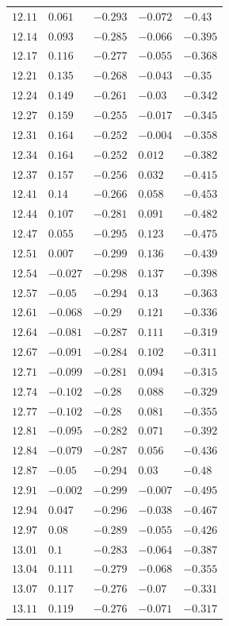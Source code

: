 \begin{center}
\begin{longtable}{lllll}
$12.11$&$0.061$&$-0.293$&$-0.072$&$-0.43$\\
$12.14$&$0.093$&$-0.285$&$-0.066$&$-0.395$\\
$12.17$&$0.116$&$-0.277$&$-0.055$&$-0.368$\\
$12.21$&$0.135$&$-0.268$&$-0.043$&$-0.35$\\
$12.24$&$0.149$&$-0.261$&$-0.03$&$-0.342$\\
$12.27$&$0.159$&$-0.255$&$-0.017$&$-0.345$\\
$12.31$&$0.164$&$-0.252$&$-0.004$&$-0.358$\\
$12.34$&$0.164$&$-0.252$&$0.012$&$-0.382$\\
$12.37$&$0.157$&$-0.256$&$0.032$&$-0.415$\\
$12.41$&$0.14$&$-0.266$&$0.058$&$-0.453$\\
$12.44$&$0.107$&$-0.281$&$0.091$&$-0.482$\\
$12.47$&$0.055$&$-0.295$&$0.123$&$-0.475$\\
$12.51$&$0.007$&$-0.299$&$0.136$&$-0.439$\\
$12.54$&$-0.027$&$-0.298$&$0.137$&$-0.398$\\
$12.57$&$-0.05$&$-0.294$&$0.13$&$-0.363$\\
$12.61$&$-0.068$&$-0.29$&$0.121$&$-0.336$\\
$12.64$&$-0.081$&$-0.287$&$0.111$&$-0.319$\\
$12.67$&$-0.091$&$-0.284$&$0.102$&$-0.311$\\
$12.71$&$-0.099$&$-0.281$&$0.094$&$-0.315$\\
$12.74$&$-0.102$&$-0.28$&$0.088$&$-0.329$\\
$12.77$&$-0.102$&$-0.28$&$0.081$&$-0.355$\\
$12.81$&$-0.095$&$-0.282$&$0.071$&$-0.392$\\
$12.84$&$-0.079$&$-0.287$&$0.056$&$-0.436$\\
$12.87$&$-0.05$&$-0.294$&$0.03$&$-0.48$\\
$12.91$&$-0.002$&$-0.299$&$-0.007$&$-0.495$\\
$12.94$&$0.047$&$-0.296$&$-0.038$&$-0.467$\\
$12.97$&$0.08$&$-0.289$&$-0.055$&$-0.426$\\
$13.01$&$0.1$&$-0.283$&$-0.064$&$-0.387$\\
$13.04$&$0.111$&$-0.279$&$-0.068$&$-0.355$\\
$13.07$&$0.117$&$-0.276$&$-0.07$&$-0.331$\\
$13.11$&$0.119$&$-0.276$&$-0.071$&$-0.317$\\

\end{longtable}
\end{center}
